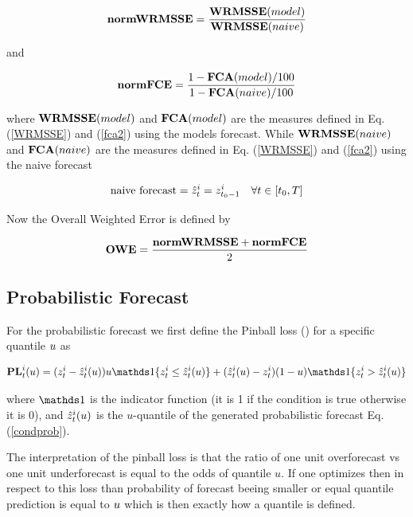 \documentclass[11pt,headings=small]{scrartcl}
\begin{document}
\begin{equation}\label{normwrmsse}
\textbf{normWRMSSE} = \frac{\textbf{WRMSSE}(model)}{\textbf{WRMSSE}(naive)}
\end{equation}

and 

\begin{equation}\label{normwrmsse}
\textbf{normFCE} = \frac{1-\textbf{FCA}(model)/100}{1-\textbf{FCA}(naive)/100}
\end{equation}

where $\textbf{WRMSSE}(model)$ and $\textbf{FCA}(model)$ are the measures defined in Eq. (\ref{WRMSSE}) and (\ref{fca2}) using the models forecast. While $\textbf{WRMSSE}(naive)$ and $\textbf{FCA}(naive)$ are the measures defined in Eq. (\ref{WRMSSE}) and (\ref{fca2}) using the naive forecast

\begin{equation}\label{naiveforecast}
\text{naive forecast} = \hat{z}^{i}_{t} = z^{i}_{t_{0} - 1} \quad \forall t\in[t_{0},T]
\end{equation}

Now the  Overall Weighted Error is defined by

\begin{equation}\label{naiveforecast}
\textbf{OWE} = \frac{\textbf{normWRMSSE} + \textbf{normFCE}}{2}
\end{equation}


\subsection{Probabilistic Forecast}
\label{subsection:ProbabilisticForecast}

For the probabilistic forecast we first define the Pinball loss (\PL) for a specific quantile $u$ as

\begin{equation}\label{pinballloss}
\textbf{PL}^{\seriesiter}_{\timeiter}(\quantile) = (\its_{\timeiter} - \itspointt(\quantile)) \quantile \identity\{\its_{\timeiter} \leq \itspointt(\quantile)\} + (\itspointt(\quantile) - \its_{\timeiter}) (1 - \quantile) \identity\{\its_{\timeiter} > \itspointt(\quantile)\}
\end{equation}

where $\identity$ is the indicator function (it is 1 if the condition is true otherwise it is 0), and $\hat{z}^{i}_{t}(u)$ is the $u$-quantile of the generated probabilistic forecast Eq. (\ref{condprob}).

The interpretation of the pinball loss is that the ratio of one unit overforecast vs one unit underforecast is equal to the odds of quantile $u$. If one optimizes then in respect to this loss than probability of forecast beeing smaller or equal quantile prediction is equal to $u$ which is then exactly how a quantile is defined.
\end{document}

